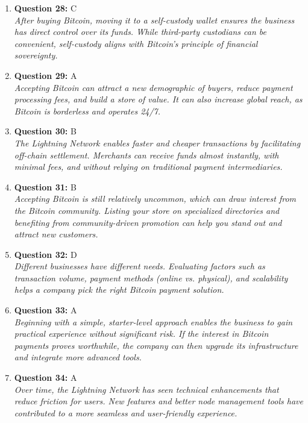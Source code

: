 \documentclass[12pt,a4paper]{article}
\begin{document}
\begin{enumerate}
\item \textbf{Question 28:} C
\\ \textit{After buying Bitcoin, moving it to a self-custody wallet ensures the business has direct control over its funds. While third-party custodians can be convenient, self-custody aligns with Bitcoin’s principle of financial sovereignty.}

\item \textbf{Question 29:} A
\\ \textit{Accepting Bitcoin can attract a new demographic of buyers, reduce payment processing fees, and build a store of value. It can also increase global reach, as Bitcoin is borderless and operates 24/7.}

\item \textbf{Question 30:} B
\\ \textit{The Lightning Network enables faster and cheaper transactions by facilitating off-chain settlement. Merchants can receive funds almost instantly, with minimal fees, and without relying on traditional payment intermediaries.}

\item \textbf{Question 31:} B
\\ \textit{Accepting Bitcoin is still relatively uncommon, which can draw interest from the Bitcoin community. Listing your store on specialized directories and benefiting from community-driven promotion can help you stand out and attract new customers.}

\item \textbf{Question 32:} D
\\ \textit{Different businesses have different needs. Evaluating factors such as transaction volume, payment methods (online vs. physical), and scalability helps a company pick the right Bitcoin payment solution.}

\item \textbf{Question 33:} A
\\ \textit{Beginning with a simple, starter-level approach enables the business to gain practical experience without significant risk. If the interest in Bitcoin payments proves worthwhile, the company can then upgrade its infrastructure and integrate more advanced tools.}

\item \textbf{Question 34:} A
\\ \textit{Over time, the Lightning Network has seen technical enhancements that reduce friction for users. New features and better node management tools have contributed to a more seamless and user-friendly experience.}


\end{enumerate}
\end{document}
